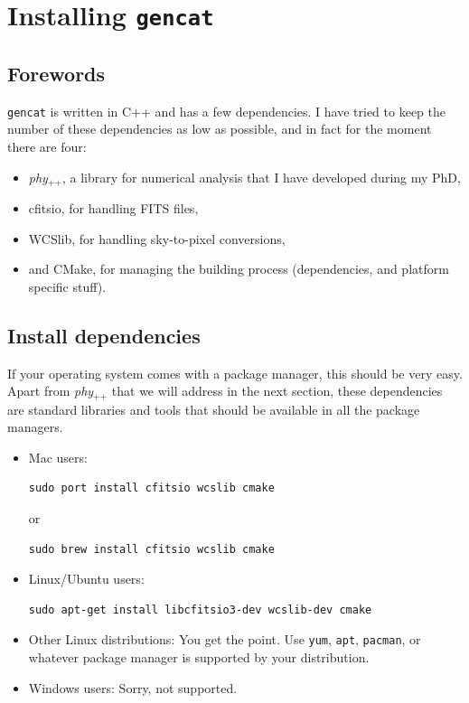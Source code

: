 \documentclass[12pt,a4paper]{article}
\newcommand{\phypp}{\textit{phy}$_{\text{++}}$\xspace}
\begin{document}
\newpage

\section{Installing \texttt{gencat}}

\subsection{Forewords}

\texttt{gencat} is written in C++ and has a few dependencies. I have tried to keep the number of these dependencies as low as possible, and in fact for the moment there are four:

\begin{itemize}
\item \phypp, a library for numerical analysis that I have developed during my PhD,
\item cfitsio, for handling FITS files,
\item WCSlib, for handling sky-to-pixel conversions,
\item and CMake, for managing the building process (dependencies, and platform specific stuff).
\end{itemize}

\subsection{Install dependencies}

If your operating system comes with a package manager, this should be very easy. Apart from \phypp that we will address in the next section, these dependencies are standard libraries and tools that should be available in all the package managers.

\begin{itemize}
\item Mac users:
\begin{verbatim}
sudo port install cfitsio wcslib cmake
\end{verbatim}
or
\begin{verbatim}
sudo brew install cfitsio wcslib cmake
\end{verbatim}
\item Linux/Ubuntu users:
\begin{verbatim}
sudo apt-get install libcfitsio3-dev wcslib-dev cmake
\end{verbatim}
\item Other Linux distributions: You get the point. Use \texttt{yum}, \texttt{apt}, \texttt{pacman}, or whatever package manager is supported by your distribution.
\item Windows users: Sorry, not supported.
\end{itemize}
\end{document}
